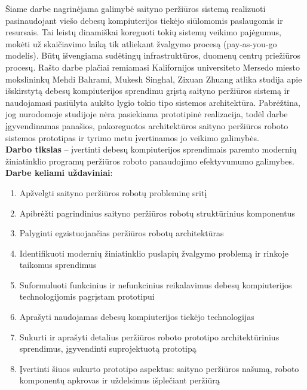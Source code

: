     Šiame darbe nagrinėjama galimybė saityno peržiūros sistemą realizuoti pasinaudojant viešo debesų kompiuterijos tiekėjo siūlomomis paslaugomis ir resursais. Tai leistų dinamiškai koreguoti tokių sistemų veikimo pajėgumus, mokėti už skaičiavimo laiką tik atliekant žvalgymo procesą (pay-as-you-go modelis). Būtų išvengiama sudėtingų infrastruktūros, duomenų centrų priežiūros procesų. Rašto darbe plačiai remiamasi Kalifornijos universiteto Mersedo miesto mokslininkų Mehdi Bahrami, Mukesh Singhal, Zixuan Zhuang atlika studija \cite{MercedCloudBasedWebCrawler} apie išskirstytą debesų kompiuterijos sprendimu grįstą saityno peržiūros sistemą ir naudojamasi pasiūlyta aukšto lygio tokio tipo sistemos architektūra. Pabrėžtina, jog nurodomoje studijoje nėra pasiekiama prototipinė realizacija, todėl darbe įgyvendinamas panašios, pakoreguotos architektūros saityno peržiūros roboto sistemos prototipas ir tyrimo metu įvertinamos jo veikimo galimybės.
\\

\textbf{Darbo tikslas} -- įvertinti debesų kompiuterijos sprendimais paremto modernių žiniatinklio programų peržiūros roboto panaudojimo efektyvumumo galimybes. 
\\

\textbf{Darbe keliami uždaviniai}:

\begin{enumerate}
    \item Apžvelgti saityno peržiūros robotų probleminę sritį
    \item Apibrėžti pagrindinius saityno peržiūros robotų struktūrinius komponentus
    \item Palyginti egzistuojančias peržiūros robotų architektūras
    \item Identifikuoti modernių žiniatinklio puslapių žvalgymo problemą ir rinkoje taikomus sprendimus
    \item Suformuluoti funkcinius ir nefunkcinius reikalavimus debesų kompiuterijos technologijomis pagrįstam prototipui
    \item Aprašyti naudojamas debesų kompiuterijos tiekėjo technologijas
    \item Sukurti ir aprašyti detalius peržiūros roboto prototipo architektūrinius sprendimus, įgyvendinti suprojektuotą prototipą
    \item Įvertinti šiuos sukurto prototipo aspektus: saityno peržiūros našumą, roboto komponentų apkrovas ir uždelsimus išplečiant peržiūrą
\end{enumerate}